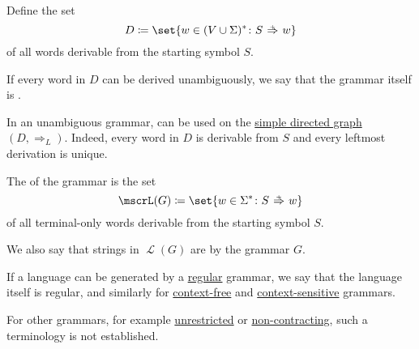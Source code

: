 \begin{definition}
\begin{thmenum}
    Define the set
    \begin{equation*}
      D \coloneqq \set{ w \in (V \cup \Sigma)^* \colon S \reloset + \Rightarrow w }
    \end{equation*}
    of all words derivable from the starting symbol \( S \).

    If every word in \( D \) can be derived unambiguously, we say that the grammar itself is .

    In an unambiguous grammar,  can be used on the \hyperref[def:quiver/simple]{simple directed graph} \( (D, \Rightarrow_L) \). Indeed, every word in \( D \) is derivable from \( S \) and every leftmost derivation is unique.

     The  of the grammar is the set
    \begin{equation*}
      \mscrL(G) \coloneqq \set{ w \in \Sigma^* \colon S \reloset + \Rightarrow w }
    \end{equation*}
    of all terminal-only words derivable from the starting symbol \( S \).

    We also say that strings in \( \mscrL(G) \) are  by the grammar \( G \).

    If a language can be generated by a \hyperref[def:chomsky_hierarchy/regular]{regular} grammar, we say that the language itself is regular, and similarly for \hyperref[def:chomsky_hierarchy/context_free]{context-free} and \hyperref[def:chomsky_hierarchy/context_sensitive]{context-sensitive} grammars.

    For other grammars, for example \hyperref[def:chomsky_hierarchy/unrestricted]{unrestricted} or \hyperref[def:chomsky_hierarchy/non_contracting]{non-contracting}, such a terminology is not established.
  \end{thmenum}
\end{definition}

